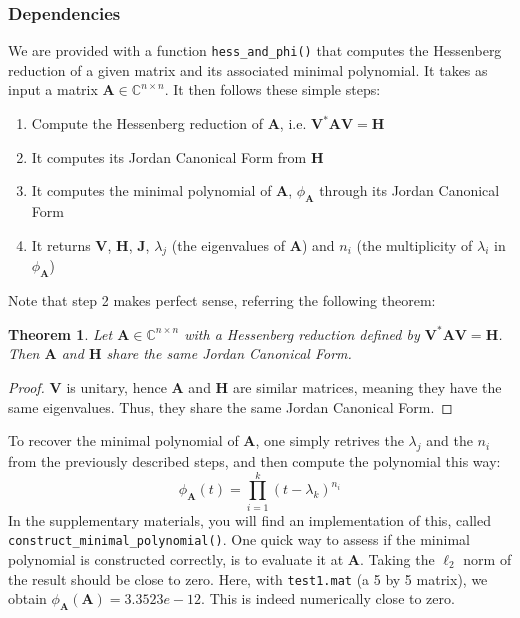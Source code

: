\documentclass[11pt]{article}
\newtheorem{theorem}{Theorem}[section]
\numberwithin{equation}{section}
\begin{document}
\subsubsection{Dependencies}
We are provided with a function \texttt{hess\_and\_phi()} that computes the Hessenberg reduction of a given matrix and its associated minimal polynomial. It takes as input a matrix $\mathbf{A}\in\mathbb{C}^{n\times n}$. It then follows these simple steps:
\begin{enumerate}
    \item Compute the Hessenberg reduction of $\mathbf{A}$, i.e. $\mathbf{V}^*\mathbf{A}\mathbf{V} = \mathbf{H}$
    \item It computes its Jordan Canonical Form from $\mathbf{H}$
    \item It computes the minimal polynomial of $\mathbf{A}$, $\phi_{\mathbf{A}}$ through its Jordan Canonical Form
    \item It returns $\mathbf{V}$, $\mathbf{H}$, $\mathbf{J}$, $\lambda_j$ (the eigenvalues of $\mathbf{A}$) and $n_i$ (the multiplicity of $\lambda_i$ in $\phi_{\mathbf{A}}$) 
\end{enumerate}
Note that step 2 makes perfect sense, referring the following theorem:
\begin{theorem}
    Let $\mathbf{A}\in\mathbb{C}^{n\times n}$ with a Hessenberg reduction defined by $\mathbf{V}^*\mathbf{A}\mathbf{V} = \mathbf{H}$. Then $\mathbf{A}$ and $\mathbf{H}$ share the same Jordan Canonical Form.
\end{theorem}
\begin{proof}
    $\mathbf{V}$ is unitary, hence $\mathbf{A}$ and $\mathbf{H}$ are similar matrices, meaning they have the same eigenvalues. Thus, they share the same Jordan Canonical Form.
\end{proof}
To recover the minimal polynomial of $\mathbf{A}$, one simply retrives the $\lambda_j$ and the $n_i$ from the previously described steps, and then compute the polynomial this way:
\begin{equation*}
    \phi_{\mathbf{A}}(t) = \prod_{i=1}^{k}(t-\lambda_k)^{n_i}
\end{equation*}
In the supplementary materials, you will find an implementation of this, called\\ \texttt{construct\_minimal\_polynomial()}. One quick way to assess if the minimal polynomial is constructed correctly, is to evaluate it at $\mathbf{A}$. Taking the $\ell_2$ norm of the result should be close to zero. Here, with \texttt{test1.mat} (a 5 by 5 matrix), we obtain $\phi_{\mathbf{A}}(\mathbf{A}) = 3.3523e-12$. This is indeed numerically close to zero.
\end{document}
